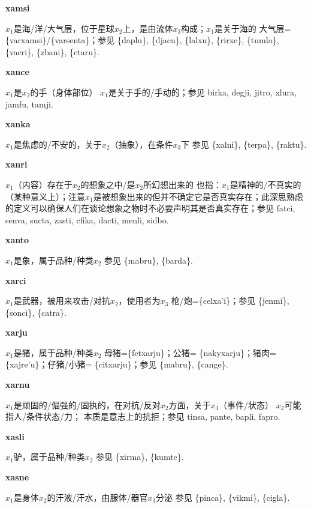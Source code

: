 \documentclass[notitlepage,twocolumn,a4paper,10pt]{book}
\begin{document}
{\sffamily\bfseries xamsi}\enspace {\ttfamily\bfseries[xas]}  $x_1$是海\slash{}洋\slash{}大气层，位于星球$x_2$上，是由流体$x_3$构成；$x_1$是关于海的 \textemdash{} 大气层= \{varxamsi\}\slash{}\{varsenta\}；参见 \{daplu\}, \{djacu\}, \{lalxu\}, \{rirxe\}, \{tumla\}, \{vacri\}, \{zbani\}, \{ctaru\}.

{\sffamily\bfseries xance}\enspace {\ttfamily\bfseries[xan     xa'e]}  $x_1$是$x_2$的手（身体部位） \textemdash{} $x_1$是关于手的\slash{}手动的；参见 {birka}, {degji}, {jitro}, {xlura}, {jamfu}, {tamji}.

{\sffamily\bfseries xanka} $x_1$是焦虑的\slash{}不安的，关于$x_2$（抽象），在条件$x_3$下 \textemdash{} 参见 \{xalni\}, \{terpa\}, \{raktu\}.

{\sffamily\bfseries xanri}\enspace {\ttfamily\bfseries[xar]}  $x_1$（内容）存在于$x_2$的想象之中\slash{}是$x_2$所幻想出来的 \textemdash{} 也指：$x_1$是精神的\slash{}不真实的（某种意义上）；注意$x_1$是被想象出来的但并不确定它是否真实存在；此深思熟虑的定义可以确保人们在谈论想象之物时不必要声明其是否真实存在；参见 {fatci}, {senva}, {sucta}, {zasti}, {cfika}, {dacti}, {menli}, {sidbo}.

{\sffamily\bfseries xanto} $x_1$是象，属于品种\slash{}种类$x_2$ \textemdash{} 参见 \{mabru\}, \{barda\}.

{\sffamily\bfseries xarci}\enspace {\ttfamily\bfseries[xac     xa'i]}  $x_1$是武器，被用来攻击\slash{}对抗$x_2$，使用者为$x_3$ \textemdash{} 枪\slash{}炮=\{celxa'i\}；参见 \{jenmi\}, \{sonci\}, \{catra\}.

{\sffamily\bfseries xarju}\enspace {\ttfamily\bfseries[xaj]}  $x_1$是猪，属于品种\slash{}种类$x_2$ \textemdash{} 母猪=\{fetxarju\}；公猪= \{nakyxarju\}；猪肉= \{xajre'u\}；仔猪\slash{}小猪= \{citxarju\}；参见 \{mabru\}, \{cange\}.

{\sffamily\bfseries xarnu} $x_1$是顽固的\slash{}倔强的\slash{}固执的，在对抗\slash{}反对$x_2$方面，关于$x_3$（事件\slash{}状态） \textemdash{} $x_2$可能指人\slash{}条件状态\slash{}力； 本质是意志上的抗拒；参见 {tinsa}, {pante}, {bapli}, {fapro}.

{\sffamily\bfseries xasli} $x_1$驴，属于品种\slash{}种类$x_2$ \textemdash{} 参见 \{xirma\}, \{kumte\}.

{\sffamily\bfseries xasne} $x_1$是身体$x_2$的汗液\slash{}汗水，由腺体\slash{}器官$x_3$分泌 \textemdash{} 参见 \{pinca\}, \{vikmi\}, \{cigla\}.
\end{document}
